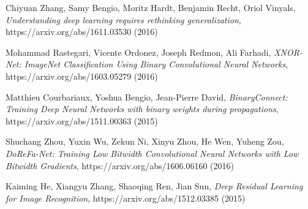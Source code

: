 \documentclass[licencjacka]{pracamgr}
\begin{document}
\begin{thebibliography}{99}

 Chiyuan Zhang, Samy Bengio, Moritz Hardt, Benjamin Recht, Oriol Vinyals, \textit{Understanding deep learning requires rethinking generalization}, https://arxiv.org/abs/1611.03530 (2016)

 Mohammad Rastegari, Vicente Ordonez, Joseph Redmon, Ali Farhadi, \textit{XNOR-Net: ImageNet Classification Using Binary Convolutional Neural Networks}, https://arxiv.org/abs/1603.05279 (2016)

 Matthieu Courbariaux, Yoshua Bengio, Jean-Pierre David, \textit{BinaryConnect: Training Deep Neural Networks with binary weights during propagations}, https://arxiv.org/abs/1511.00363 (2015)

 Shuchang Zhou, Yuxin Wu, Zekun Ni, Xinyu Zhou, He Wen, Yuheng Zou, \textit{DoReFa-Net: Training Low Bitwidth Convolutional Neural Networks with Low Bitwidth Gradients}, https://arxiv.org/abs/1606.06160 (2016)

 Kaiming He, Xiangyu Zhang, Shaoqing Ren, Jian Sun, \textit{Deep Residual Learning for Image Recognition}, https://arxiv.org/abs/1512.03385 (2015)

\end{thebibliography}
\end{document}
